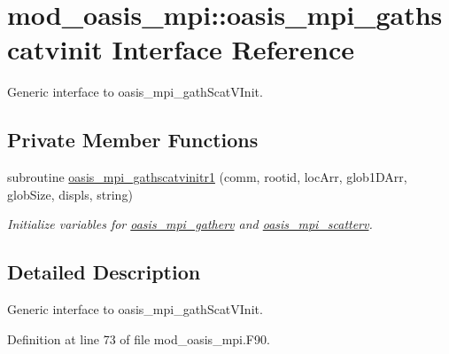 \hypertarget{interfacemod__oasis__mpi_1_1oasis__mpi__gathscatvinit}{\section{mod\+\_\+oasis\+\_\+mpi\+:\+:oasis\+\_\+mpi\+\_\+gathscatvinit Interface Reference}
\label{interfacemod__oasis__mpi_1_1oasis__mpi__gathscatvinit}
}


Generic interface to oasis\+\_\+mpi\+\_\+gath\+Scat\+V\+Init.  


\subsection*{Private Member Functions}
\begin{DoxyCompactItemize}
\item 
subroutine \hyperlink{interfacemod__oasis__mpi_1_1oasis__mpi__gathscatvinit_a15fc3df477e1fa561fcee17ed718bff8}{oasis\+\_\+mpi\+\_\+gathscatvinitr1} (comm, rootid, loc\+Arr, glob1\+D\+Arr, glob\+Size, displs, string)
\begin{DoxyCompactList}\small\item\em Initialize variables for \hyperlink{interfacemod__oasis__mpi_1_1oasis__mpi__gatherv}{oasis\+\_\+mpi\+\_\+gatherv} and \hyperlink{interfacemod__oasis__mpi_1_1oasis__mpi__scatterv}{oasis\+\_\+mpi\+\_\+scatterv}. \end{DoxyCompactList}\end{DoxyCompactItemize}


\subsection{Detailed Description}
Generic interface to oasis\+\_\+mpi\+\_\+gath\+Scat\+V\+Init. 

Definition at line 73 of file mod\+\_\+oasis\+\_\+mpi.\+F90.



